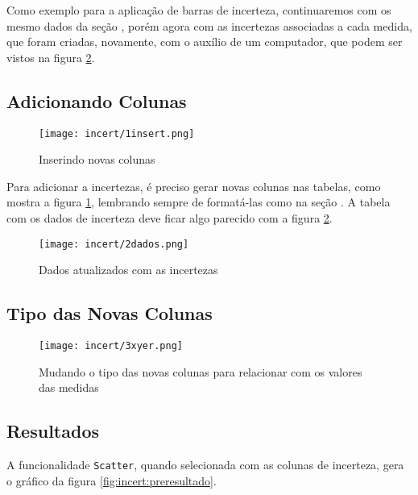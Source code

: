 Como exemplo para a aplicação de barras de incerteza, continuaremos com os mesmo dados da seção , porém agora com as incertezas associadas a cada medida, que foram criadas, novamente, com o auxílio de um computador, que podem ser vistos na figura \ref{fig:incert:dados}.


\subsection{Adicionando Colunas}

    \begin{figure}[htbp]
        \centering
        \texttt{[image: incert/1insert.png]}

        \caption{Inserindo novas colunas}
        \label{fig:incert:colunas}
    \end{figure}

    Para adicionar a incertezas, é preciso gerar novas colunas nas tabelas, como mostra a figura \ref{fig:incert:colunas}, lembrando sempre de formatá-las como na seção . A tabela com os dados de incerteza deve ficar algo parecido com a figura \ref{fig:incert:dados}.

    \begin{figure}[htbp]
        \centering
        \texttt{[image: incert/2dados.png]}

        \caption{Dados atualizados com as incertezas}
        \label{fig:incert:dados}
    \end{figure}


\subsection{Tipo das Novas Colunas}

    \begin{figure}[htbp]
        \centering
        \texttt{[image: incert/3xyer.png]}
        \caption{Mudando o tipo das novas colunas para relacionar com os valores das medidas}
        \label{fig:incert:tipos}
    \end{figure}


\subsection{Resultados}

    A funcionalidade \texttt{Scatter}, quando selecionada com as colunas de incerteza, gera o gráfico da figura \ref{fig:incert:preresultado}.

